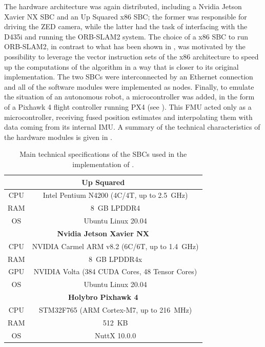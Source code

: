 The hardware architecture was again distributed, including a Nvidia Jetson Xavier NX SBC and an Up Squared x86 SBC; the former was responsible for driving the ZED camera, while the latter had the task of interfacing with the D435i and running the ORB-SLAM2 system. The choice of a x86 SBC to run ORB-SLAM2, in contrast to what has been shown in , was motivated by the possibility to leverage the vector instruction sets of the x86 architecture to speed up the computations of the algorithm in a way that is closer to its original implementation. The two SBCs were interconnected by an Ethernet connection and all of the software modules were implemented as \ROS nodes. Finally, to emulate the situation of an autonomous robot, a microcontroller was added, in the form of a Pixhawk 4 flight controller running PX4 (see ). This FMU acted only as a microcontroller, receiving fused position estimates and interpolating them with data coming from its internal IMU. A summary of the technical characteristics of the hardware modules is given in .
\begin{table}[t]
  \centering
  \begin{tabular}{|c|c|}
    \hline
    \multicolumn{2}{|c|}{\textbf{Up Squared}}\\
    \hline
    CPU & Intel Pentium N4200 (4C/4T, up to \SI{2.5}{GHz})\\
    RAM & \SI{8}{GB} LPDDR4\\
    OS  & Ubuntu Linux 20.04\\
    \hline
    \multicolumn{2}{|c|}{\textbf{Nvidia Jetson Xavier NX}}\\
    \hline
    CPU & NVIDIA Carmel ARM v8.2 (6C/6T, up to \SI{1.4}{GHz})\\
    RAM & \SI{8}{GB} LPDDR4x\\
    GPU & NVIDIA Volta (384 CUDA Cores, 48 Tensor Cores)\\
    OS  & Ubuntu Linux 20.04\\
    \hline
    \multicolumn{2}{|c|}{\textbf{Holybro Pixhawk 4}}\\
    \hline
    CPU & STM32F765 (ARM Cortex-M7, up to \SI{216}{MHz})\\
    RAM & \SI{512}{KB}\\
    OS  & NuttX 10.0.0\\
    \hline
  \end{tabular}
  \vspace{5pt}
  \caption{Main technical specifications of the SBCs used in the implementation of \cite{bianchi_efficient_2023}.}
  \label{tab:iccad23_sbcs}
\end{table}

